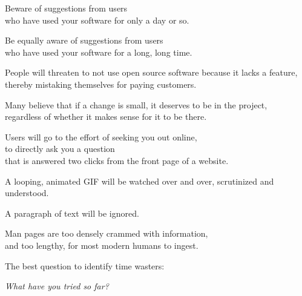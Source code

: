 \documentclass[t,handout,aspectratio=169]{beamer}
\begin{document}
\begin{frame}[fragile]%
    \vfill
    Beware of suggestions from users \\
    who have used your software for only a day or so. \pause

    Be equally aware of suggestions from users \\
    who have used your software for a long, long time.
\end{frame}

\begin{frame}[fragile]%
    \vfill
    People will threaten to not use open source software because it lacks a feature, \pause \\
    thereby mistaking themselves for paying customers.
\end{frame}

\begin{frame}[fragile]%
    \vfill
    Many believe that if a change is small, it deserves to be in the project, \pause \\
    regardless of whether it makes sense for it to be there.
\end{frame}

\begin{frame}[fragile]%
    \vfill
    Users will go to the effort of seeking you out online, \pause \\
    to directly ask you a question \pause \\
    that is answered two clicks from the front page of a website.
\end{frame}

\begin{frame}[fragile]%
    \vfill
    A looping, animated GIF will be watched over and over, scrutinized and understood.

    \pause A paragraph of text will be ignored.
\end{frame}

\begin{frame}[fragile]%
    \vfill
    Man pages are too densely crammed with information, \\
    and too lengthy, for most modern humans to ingest.
\end{frame}

\begin{frame}[fragile]%
    \vfill
    The best question to identify time wasters: \pause

    \textit{What have you tried so far?}
\end{frame}
\end{document}
